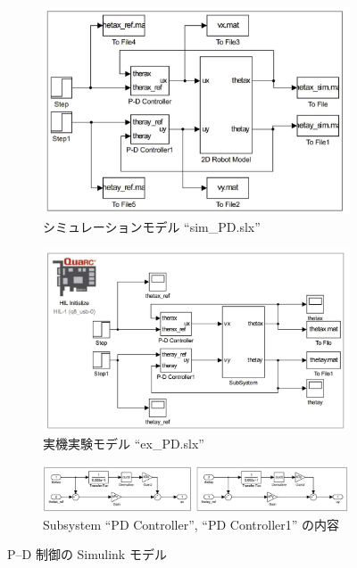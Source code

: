 \begin{figure}[H]
    \centering
    \begin{subfigure}{0.8\linewidth}
        \centering
        \includegraphics[width=\linewidth]{figure/sim_PD_slx.pdf}
        \caption{シミュレーションモデル ``sim\_PD.slx''}
    \end{subfigure}
    
    \vspace{0.5cm}
    
    \begin{subfigure}{0.8\linewidth}
        \centering
        \includegraphics[width=\linewidth]{figure/ex_PD_slx.pdf}
        \caption{実機実験モデル ``ex\_PD.slx''}
    \end{subfigure}
    
    \vspace{0.5cm}
    
    \begin{subfigure}{0.8\linewidth}
        \centering
        \includegraphics[width=\linewidth]{figure/PD_Controller_detail.pdf}
        \caption{Subsystem ``PD Controller'', ``PD Controller1'' の内容}
    \end{subfigure}
    
    \caption{P--D 制御の Simulink モデル}
    \label{fig:pd_simulink_model}
\end{figure}

